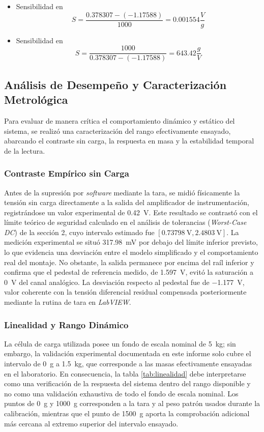 \begin{itemize}
    \item Sensibilidad en \si{}
          $$S=\frac{0.378307 - (-1.17588)}{1000} = 0.001554  \si{\frac{V}{g}}$$
    \item Sensibilidad en \si{}
          $$S=\frac{1000}{0.378307 - (-1.17588)} = 643.42  \si{\frac{g}{V}}$$
\end{itemize}



\subsection{Análisis de Desempeño y Caracterización Metrológica}

Para evaluar de manera crítica el comportamiento dinámico y estático del sistema, se realizó una caracterización del rango efectivamente ensayado, abarcando el contraste sin carga, la respuesta en masa y la estabilidad temporal de la lectura.

\subsubsection{Contraste Empírico sin Carga}
Antes de la supresión por \textit{software} mediante la tara, se midió físicamente la tensión sin carga directamente a la salida del amplificador de instrumentación, registrándose un valor experimental de \SI{0.42}{\V}. Este resultado se contrastó con el límite teórico de seguridad calculado en el análisis de tolerancias (\textit{Worst-Case DC}) de la sección 2, cuyo intervalo estimado fue $[\SI{0.73798}{\V}, \SI{2.4803}{\V}]$. La medición experimental se situó \SI{317.98}{\milli\V} por debajo del límite inferior previsto, lo que evidencia una desviación entre el modelo simplificado y el comportamiento real del montaje. No obstante, la salida permanece por encima del raíl inferior y confirma que el pedestal de referencia medido, de \SI{1.597}{\V}, evitó la saturación a \SI{0}{\V} del canal analógico. La desviación respecto al pedestal fue de \SI{-1.177}{\V}, valor coherente con la tensión diferencial residual compensada posteriormente mediante la rutina de tara en \textit{LabVIEW}.

\subsubsection{Linealidad y Rango Dinámico}
La célula de carga utilizada posee un fondo de escala nominal de \SI{5}{\kg}; sin embargo, la validación experimental documentada en este informe solo cubre el intervalo de \SI{0}{\g} a \SI{1.5}{\kg}, que corresponde a las masas efectivamente ensayadas en el laboratorio. En consecuencia, la tabla \ref{tab:linealidad} debe interpretarse como una verificación de la respuesta del sistema dentro del rango disponible y no como una validación exhaustiva de todo el fondo de escala nominal. Los puntos de \SI{0}{\g} y \SI{1000}{\g} corresponden a la tara y al peso patrón usados durante la calibración, mientras que el punto de \SI{1500}{\g} aporta la comprobación adicional más cercana al extremo superior del intervalo ensayado.

